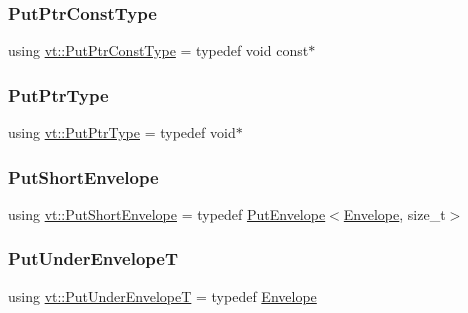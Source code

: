 \mbox{\label{namespacevt_a494d6c6dc5cdb9a8d61eaedfa2c4d4f3}} 
\subsubsection{\texorpdfstring{Put\+Ptr\+Const\+Type}{PutPtrConstType}}
{\footnotesize\ttfamily using \hyperlink{namespacevt_a494d6c6dc5cdb9a8d61eaedfa2c4d4f3}{vt\+::\+Put\+Ptr\+Const\+Type} = typedef void const$\ast$}

\mbox{\label{namespacevt_a537693bfe0223c71eb52bdbd6ea2c741}} 
\subsubsection{\texorpdfstring{Put\+Ptr\+Type}{PutPtrType}}
{\footnotesize\ttfamily using \hyperlink{namespacevt_a537693bfe0223c71eb52bdbd6ea2c741}{vt\+::\+Put\+Ptr\+Type} = typedef void$\ast$}

\mbox{\label{namespacevt_a8d7a7de9e76bfea1600009a775b7298c}} 
\subsubsection{\texorpdfstring{Put\+Short\+Envelope}{PutShortEnvelope}}
{\footnotesize\ttfamily using \hyperlink{namespacevt_a8d7a7de9e76bfea1600009a775b7298c}{vt\+::\+Put\+Short\+Envelope} = typedef \hyperlink{structvt_1_1_put_envelope}{Put\+Envelope}$<$\hyperlink{namespacevt_aa9c8cc094b5361482021d63012987814}{Envelope}, size\+\_\+t$>$}

\mbox{\label{namespacevt_a233c004b26ccd826ef10686169371e01}} 
\subsubsection{\texorpdfstring{Put\+Under\+EnvelopeT}{PutUnderEnvelopeT}}
{\footnotesize\ttfamily using \hyperlink{namespacevt_a233c004b26ccd826ef10686169371e01}{vt\+::\+Put\+Under\+EnvelopeT} = typedef \hyperlink{namespacevt_aa9c8cc094b5361482021d63012987814}{Envelope}}

